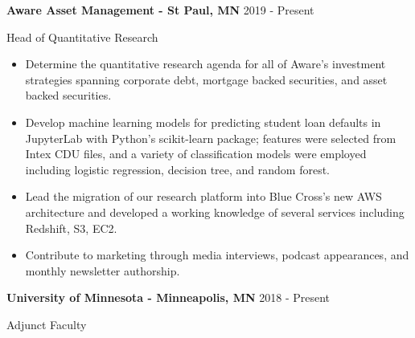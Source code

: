 \documentclass[11pt, a4paper]{awesome-cv}
\begin{document}
\textbf{Aware Asset Management - St Paul, MN} \hfill 2019 - Present

\vspace{-1ex}

Head of Quantitative Research

\vspace{-1.5ex}

\small

\begin{itemize}
\item
  Determine the quantitative research agenda for all of Aware's
  investment strategies spanning corporate debt, mortgage backed
  securities, and asset backed securities. \vspace{-0.5ex}
\item
  Develop machine learning models for predicting student loan defaults
  in JupyterLab with Python's scikit-learn package; features were
  selected from Intex CDU files, and a variety of classification models
  were employed including logistic regression, decision tree, and random
  forest. \vspace{-0.5ex}
\item
  Lead the migration of our research platform into Blue Cross's new AWS
  architecture and developed a working knowledge of several services
  including Redshift, S3, EC2. \vspace{-0.5ex}
\item
  Contribute to marketing through media interviews, podcast appearances,
  and monthly newsletter authorship. \vspace{-0.5ex}
\end{itemize}

\normalsize

\textbf{University of Minnesota - Minneapolis, MN} \hfill 2018 - Present

\vspace{-1ex}

Adjunct Faculty

\vspace{-1.5ex}

\small
\end{document}
